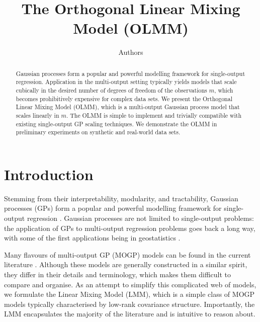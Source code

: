 \documentclass{article}
\title{The Orthogonal Linear Mixing Model (OLMM)}
\author{
    Authors
}
\begin{document}
\maketitle

\begin{abstract}
    Gaussian processes form a popular and powerful modelling framework for single-output regression.
    Application in the multi-output setting typically yields models that scale cubically in the desired number of degrees of freedom of the observations $m$, which becomes prohibitively expensive for complex data sets.
    We present the Orthogonal Linear Mixing Model (OLMM), which is a multi-output Gaussian process model that scales linearly in $m$.
    The OLMM is simple to implement and trivially compatible with existing single-output GP scaling techniques.
    We demonstrate the OLMM in preliminary experiments on synthetic and real-world data sets.
\end{abstract}

\section{Introduction}
Stemming from their interpretability, modularity, and tractability, Gaussian processes (GPs) form a popular and powerful modelling framework for single-output regression \cite{Rasmussen:2006:Gaussian_Processes}.
Gaussian processes are not limited to single-output problems:
the application of GPs to multi-output regression problems goes back a long way, with some of the first applications being in geostatistics
\cite{Goovaerts:1997:Geostatistics_for_Natural_Resources_Evaluation,Stein:1999:Interpolation_of_Spatial_Data,Wackernagel:2003:Multivariate_Geostatistics}.

Many flavours of multi-output GP (MOGP) models can be found in the current literature \cite{Wackernagel:2003:Multivariate_Geostatistics,Teh:2005:Semiparametric_Latent_Factor,Boyle:2005:Dependent_Gaussian_Processes,Bonilla:2007:Kernel_Multi-Task_Learning_Using_Task-Specific,Bonilla:2008:Multi-Task_Gaussian_Process,Osborne:2008:Towards_Real-Time_Information_Processing_of,Alvarez:2009:Latent_Force_Models,Alvarez:2009:Sparse_Convolved_Gaussian_Processes_for,Yu:2009:Gaussian-Process_Factor_Analysis_for_Low-Dimensional,Alvarez:2010:Efficient_Multioutput_Gaussian_Processes_Through,Alvarez:2011:Computationally_Efficient_Convolved,Wilson:2012:GP_Regression_Networks,Nguyen:2014:Collaborative_Multi-Output,Ulrich:2015:Cross_Spectrum,Bruinsma:2016:GGPCM,Parra:2017:Spectral_Mixture_Kernels_for_Multi-Output,Requeima:2018:The_Gaussian_Process_Autoregressive_Regression}.
Although these models are generally constructed in a similar spirit, they differ in their details and terminology, which makes them difficult to compare and organise.
As an attempt to simplify this complicated web of models, we formulate the Linear Mixing Model (LMM), which is a simple class of MOGP models typically characterised by low-rank covariance structure.
Importantly, the LMM encapsulates the majority of the literature and is intuitive to reason about.
\end{document}
